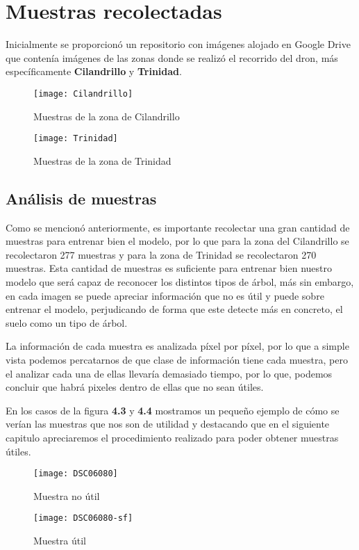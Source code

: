 \section{Muestras recolectadas}
Inicialmente se proporcionó un repositorio con imágenes alojado en Google Drive que contenía imágenes de las zonas donde se realizó el recorrido del dron, más específicamente \textbf{Cilandrillo} y \textbf{Trinidad}.

\begin{figure}
 \centering
\texttt{[image: Cilandrillo]}
\caption{Muestras de la zona de Cilandrillo}
\end{figure}

\begin{figure}
 \centering
\texttt{[image: Trinidad]}
\caption{Muestras de la zona de Trinidad}
\end{figure}

\subsection{Análisis de muestras}
Como se mencionó anteriormente, es importante recolectar una gran cantidad de muestras para entrenar bien el modelo, por lo que para la zona del Cilandrillo se recolectaron 277 muestras y para la zona de Trinidad se recolectaron 270 muestras. Esta cantidad de muestras es suficiente para entrenar bien nuestro modelo que será capaz de reconocer los distintos tipos de árbol, más sin embargo, en cada imagen se puede apreciar información que no es útil y puede sobre entrenar el modelo, perjudicando de forma que este detecte más en concreto, el suelo como un tipo de árbol.

La información de cada muestra es analizada píxel por píxel, por lo que a simple vista podemos percatarnos de que clase de información tiene cada muestra, pero el analizar cada una de ellas llevaría demasiado tiempo, por lo que, podemos concluir que habrá pixeles dentro de ellas que no sean útiles. 

En los casos de la figura \textbf{4.3} y \textbf{4.4} mostramos un pequeño ejemplo de cómo se verían las muestras que nos son de utilidad y destacando que en el siguiente capitulo apreciaremos el procedimiento realizado para poder obtener muestras útiles.

\begin{figure}[b]
  \centering
  \begin{minipage}[b]{0.4\textwidth}
    \texttt{[image: DSC06080]}
    \caption{Muestra no útil}
  \end{minipage}
  \hfill
  \begin{minipage}[b]{0.4\textwidth}
    \texttt{[image: DSC06080-sf]}
    \caption{Muestra útil}
  \end{minipage}
\end{figure}

